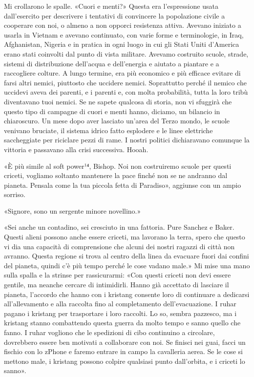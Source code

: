 Mi crollarono le spalle. «Cuori e menti?» Questa era l'espressione usata
dall'esercito per descrivere i tentativi di convincere la popolazione
civile a cooperare con noi, o almeno a non opporci resistenza attiva.
Avevano iniziato a usarla in Vietnam e avevano continuato, con varie
forme e terminologie, in Iraq, Afghanistan, Nigeria e in pratica in ogni
luogo in cui gli Stati Uniti d'America erano stati coinvolti dal punto
di vista militare. Avevamo costruito scuole, strade, sistemi di
distribuzione dell'acqua e dell'energia e aiutato a piantare e a
raccogliere colture. A lungo termine, era più economico e più efficace
evitare di farsi altri nemici, piuttosto che uccidere nemici.
Soprattutto perché il nemico che uccidevi aveva dei parenti, e i parenti
e, con molta probabilità, tutta la loro tribù diventavano tuoi nemici.
Se ne sapete qualcosa di storia, non vi sfuggirà che questo tipo di
campagne di cuori e menti hanno, diciamo, un bilancio in chiaroscuro. Un
mese dopo aver lasciato un'area del Terzo mondo, le scuole venivano
bruciate, il sistema idrico fatto esplodere e le linee elettriche
saccheggiate per riciclare pezzi di rame. I nostri politici dichiaravano
comunque la vittoria e passavano alla crisi successiva. Hooah.

«È più simile al soft power¹⁴, Bishop. Noi non costruiremo scuole per
questi criceti, vogliamo soltanto mantenere la pace finché non se ne
andranno dal pianeta. Pensala come la tua piccola fetta di Paradiso»,
aggiunse con un ampio sorriso.

«Signore, sono un sergente minore novellino.»

«Sei anche un contadino, sei cresciuto in una fattoria. Pure Sanchez e
Baker. Questi alieni possono anche essere criceti, ma lavorano la terra,
spero che questo vi dia una capacità di comprensione che alcuni dei
nostri ragazzi di città non avranno. Questa regione si trova al centro
della linea da evacuare fuori dai confini del pianeta, quindi c'è più
tempo perché le cose vadano male.» Mi mise una mano sulla spalla e la
strinse per rassicurarmi: «Con questi criceti non devi essere gentile,
ma neanche cercare di intimidirli. Hanno già accettato di lasciare il
pianeta, l'accordo che hanno con i kristang consente loro di continuare
a dedicarsi all'allevamento e alla raccolta fino al completamento
dell'evacuazione. I ruhar pagano i kristang per trasportare i loro
raccolti. Lo so, sembra pazzesco, ma i kristang stanno combattendo
questa guerra da molto tempo e sanno quello che fanno. I ruhar vogliono
che le spedizioni di cibo continuino a circolare, dovrebbero essere ben
motivati a collaborare con noi. Se finisci nei guai, facci un fischio
con lo zPhone e faremo entrare in campo la cavalleria aerea. Se le cose
si mettono male, i kristang possono colpire qualsiasi punto dall'orbita,
e i criceti lo sanno».

